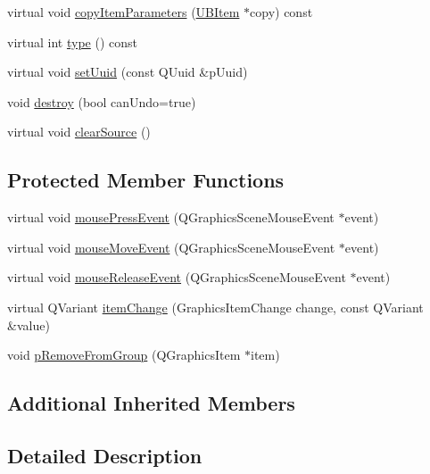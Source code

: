 \begin{DoxyCompactItemize}
virtual void \hyperlink{class_u_b_graphics_group_container_item_a70f918cf5ac238dc33232946fa893f9a}{copy\-Item\-Parameters} (\hyperlink{class_u_b_item}{U\-B\-Item} $\ast$copy) const 
\item 
virtual int \hyperlink{class_u_b_graphics_group_container_item_aeb2222d49ff6a0b5f8808f4f99a0b635}{type} () const 
\item 
virtual void \hyperlink{class_u_b_graphics_group_container_item_adf49f1e629c8ddf5d65ffe8d3ac63ab2}{set\-Uuid} (const Q\-Uuid \&p\-Uuid)
\item 
void \hyperlink{class_u_b_graphics_group_container_item_a71bf648d30983ff33b0e94f515268b80}{destroy} (bool can\-Undo=true)
\item 
virtual void \hyperlink{class_u_b_graphics_group_container_item_ad6c6b58db4de32278fe0974549a07111}{clear\-Source} ()
\end{DoxyCompactItemize}
\subsection*{Protected Member Functions}
\begin{DoxyCompactItemize}
\item 
virtual void \hyperlink{class_u_b_graphics_group_container_item_a2f9c92520b330200f2b40de45c5fa339}{mouse\-Press\-Event} (Q\-Graphics\-Scene\-Mouse\-Event $\ast$event)
\item 
virtual void \hyperlink{class_u_b_graphics_group_container_item_a296d9363c453358d89df6f616670eb67}{mouse\-Move\-Event} (Q\-Graphics\-Scene\-Mouse\-Event $\ast$event)
\item 
virtual void \hyperlink{class_u_b_graphics_group_container_item_ab0e7550f5b2f1df73be516baad44c24c}{mouse\-Release\-Event} (Q\-Graphics\-Scene\-Mouse\-Event $\ast$event)
\item 
virtual Q\-Variant \hyperlink{class_u_b_graphics_group_container_item_a90a46682470b79ebca0bfd8c4fab2450}{item\-Change} (Graphics\-Item\-Change change, const Q\-Variant \&value)
\item 
void \hyperlink{class_u_b_graphics_group_container_item_ad1e754e3772a1d1b931fc3b29b014ff1}{p\-Remove\-From\-Group} (Q\-Graphics\-Item $\ast$item)
\end{DoxyCompactItemize}
\subsection*{Additional Inherited Members}


\subsection{Detailed Description}


